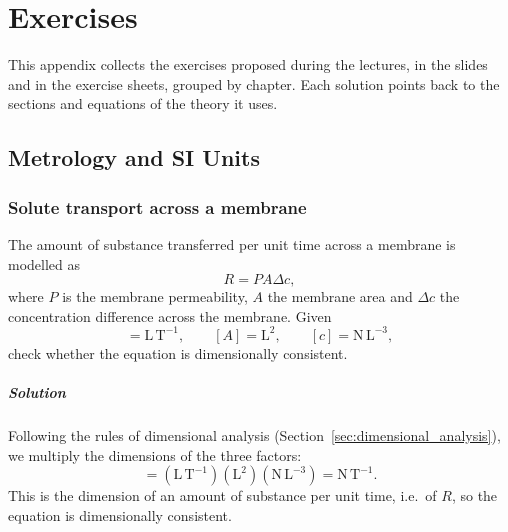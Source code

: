 \chapter{Exercises}
\label{app:exercises}

This appendix collects the exercises proposed during the lectures, in the slides and in the exercise sheets, grouped by chapter. Each solution points back to the sections and equations of the theory it uses.

\section{Metrology and SI Units}
\label{app:ex_ch1}

\subsection{Solute transport across a membrane}
\label{ex:membrane_transport}

The amount of substance transferred per unit time across a membrane is modelled as
\begin{equation*}
R = P A \Delta c,
\end{equation*}
where $P$ is the membrane permeability, $A$ the membrane area and $\Delta c$ the concentration difference across the membrane. Given
\begin{equation*}
[P] = \text{L}\,\text{T}^{-1}, \qquad [A] = \text{L}^2, \qquad [c] = \text{N}\,\text{L}^{-3},
\end{equation*}
check whether the equation is dimensionally consistent.

\paragraph{Solution} Following the rules of dimensional analysis (Section~\ref{sec:dimensional_analysis}), we multiply the dimensions of the three factors:
\begin{equation*}
[P A \Delta c] = (\text{L}\,\text{T}^{-1})(\text{L}^2)(\text{N}\,\text{L}^{-3}) = \text{N}\,\text{T}^{-1}.
\end{equation*}
This is the dimension of an amount of substance per unit time, i.e.\ of $R$, so the equation is dimensionally consistent.

